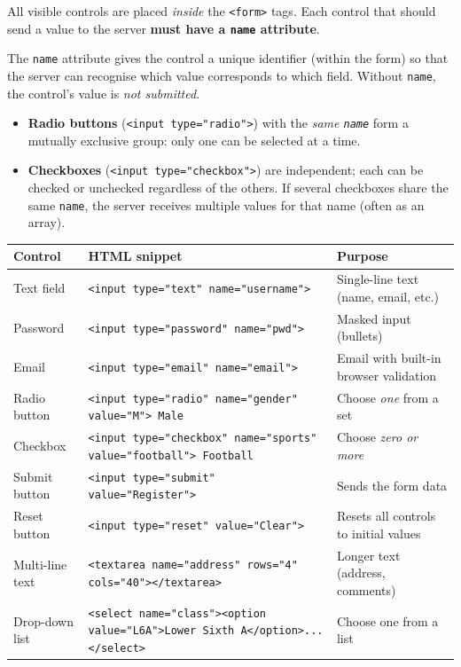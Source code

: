 \documentclass[11pt]{article}
\newcounter{popsec}
\newcounter{popsub}
\newcommand{\courssub}[1]{%
  \stepcounter{popsub}%
  \par\vspace{9pt}\noindent{\popxbold\fontsize{11.5}{13}\selectfont\color{popink}{\color{poporange}\thepopsec.\thepopsub}\hspace{6pt}#1}\par\nopagebreak\vspace{4pt}
}
\begin{document}
\courssub{Common form controls}

All visible controls are placed \emph{inside} the \texttt{<form>} tags.  Each control that should send a value to the server \textbf{must have a \texttt{name} attribute}.

\begin{definition}
The \texttt{name} attribute gives the control a unique identifier (within the form) so that the server can recognise which value corresponds to which field.  Without \texttt{name}, the control's value is \emph{not submitted}.
\end{definition}

\begin{propriete}
\begin{itemize}
  \item \textbf{Radio buttons} (\texttt{<input type="radio">}) with the \emph{same \texttt{name}} form a mutually exclusive group: only one can be selected at a time.
  \item \textbf{Checkboxes} (\texttt{<input type="checkbox">}) are independent; each can be checked or unchecked regardless of the others.  If several checkboxes share the same \texttt{name}, the server receives multiple values for that name (often as an array).
\end{itemize}
\end{propriete}

\begin{center}
\begin{tabularx}{\linewidth}{|l|X|X|}
\hline
\rowcolor{popblueL}
\textbf{Control} & \textbf{HTML snippet} & \textbf{Purpose} \\
\hline
Text field & \texttt{<input type="text" name="username">} & Single-line text (name, email, etc.) \\
Password & \texttt{<input type="password" name="pwd">} & Masked input (bullets) \\
Email & \texttt{<input type="email" name="email">} & Email with built-in browser validation \\
Radio button & \texttt{<input type="radio" name="gender" value="M"> Male} & Choose \emph{one} from a set \\
Checkbox & \texttt{<input type="checkbox" name="sports" value="football"> Football} & Choose \emph{zero or more} \\
Submit button & \texttt{<input type="submit" value="Register">} & Sends the form data \\
Reset button & \texttt{<input type="reset" value="Clear">} & Resets all controls to initial values \\
Multi-line text & \texttt{<textarea name="address" rows="4" cols="40"></textarea>} & Longer text (address, comments) \\
Drop-down list & \texttt{<select name="class"><option value="L6A">Lower Sixth A</option>...</select>} & Choose one from a list \\
\hline
\end{tabularx}
\end{center}
\end{document}
